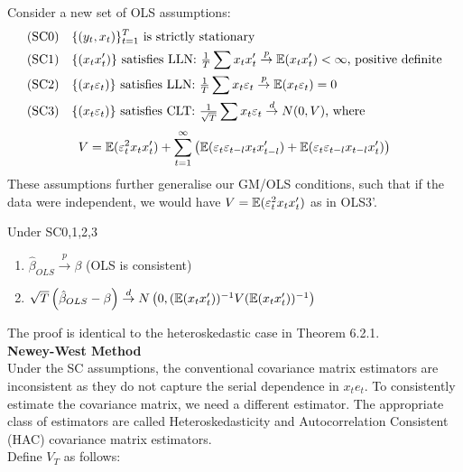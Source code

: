 \documentclass[DIV=14,titlepage=false]{scrreprt}
\begin{document}
Consider a new set of OLS assumptions:
\begin{align*}
    \text{(SC0)}& \quad \{(y_t, x_t)\}^T_{t=1} \text{ is strictly stationary}\\
    \text{(SC1)}& \quad \{(x_tx_t')\} \text{ satisfies LLN: }\tfrac{1}{T}\sum x_t x_t' \overset{p}{\to} \mathbb{E}(x_t x_t') < \infty \text{, positive definite}\\
    \text{(SC2)}& \quad \{(x_t \varepsilon_t)\} \text{ satisfies LLN: }\tfrac{1}{T}\sum x_t \varepsilon_t \overset{p}{\to} \mathbb{E}(x_t \varepsilon_t) =0\\
    \text{(SC3)}& \quad \{(x_t \varepsilon_t)\} \text{ satisfies CLT: }\tfrac{1}{\sqrt{T}}\sum x_t \varepsilon_t \overset{d}{\to} N(0,V) \text{, where }
\end{align*}
\[ V= \mathbb{E}(\varepsilon_t^2 x_t x_t')+\sum_{t=1}^{\infty}\left(\mathbb{E}(\varepsilon_t \varepsilon_{t-l} x_t x_{t-l}') + \mathbb{E}(\varepsilon_t \varepsilon_{t-l} x_{t-l} x_{t}')\right)\]
These assumptions further generalise our GM/OLS conditions, such that if the data were independent, we would have $V=\mathbb{E}(\varepsilon_t^2x_tx_t')$ as in OLS3'.

\begin{theorem}
    Under SC0,1,2,3
    \begin{enumerate}
        \item $\hat \beta_{OLS} \overset{p}{\to} \beta$ (OLS is consistent)
        \item $\sqrt{T}\left(\hat \beta_{OLS} -\beta\right) \overset{d}{\to} N\left(0,(\mathbb{E}(x_tx_t'))^{-1}V (\mathbb{E}(x_tx_t'))^{-1}\right)$
    \end{enumerate}
\end{theorem}
The proof is identical to the heteroskedastic case in Theorem 6.2.1.\\

\textbf{Newey-West Method}\\
Under the SC assumptions, the conventional covariance matrix estimators are inconsistent as they do not capture the serial dependence in $x_te_t$. To consistently estimate the covariance matrix, we need a different estimator. The appropriate class of estimators are called Heteroskedasticity and Autocorrelation Consistent (HAC) covariance matrix estimators.\\

Define $V_T$ as follows:
\end{document}
